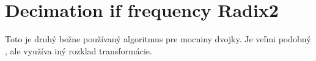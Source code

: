 \section{Decimation if frequency Radix2}
Toto je druhý bežne používaný algoritmus pre mocniny dvojky. Je veľmi
podobný , ale využíva iný rozklad
transformácie.
